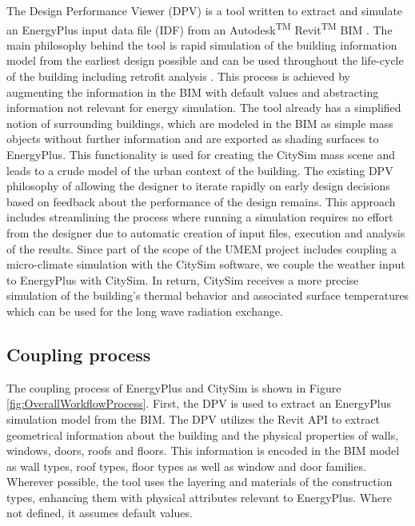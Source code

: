 \documentclass{tBPS2e}
\theoremstyle{plain}
\theoremstyle{definition}
\theoremstyle{remark}
\begin{document}
The Design Performance Viewer (DPV) is a tool written to extract and simulate
an EnergyPlus input data file (IDF) from an Autodesk\textsuperscript{TM} Revit\textsuperscript{TM} BIM
\citep{Schlueter2009}. The main philosophy behind the tool is rapid simulation
of the building information model from the earliest design possible and can be used throughout the life-cycle of the building including retrofit analysis \citep{Miller:2014tu}. This process is achieved by augmenting the information in the BIM with default
values and abstracting information not relevant for energy simulation. The tool
already has a simplified notion of surrounding buildings, which are modeled in
the BIM as simple mass objects without further information and are exported as
shading surfaces to EnergyPlus. This functionality is used for
creating the CitySim mass scene and leads to a crude model of the urban
context of the building. The existing DPV philosophy of allowing the designer to
iterate rapidly on early design decisions based on feedback about the
performance of the design remains. This approach
includes streamlining the process where running a simulation
requires no effort from the designer due to automatic creation of input files,
execution and analysis of the results. Since part of the scope of the UMEM
project includes coupling a micro-climate simulation with the CitySim software,
we couple the weather input to EnergyPlus with CitySim.  In return, CitySim receives a more precise simulation of
the building's thermal behavior and associated surface temperatures which can
be used for the long wave radiation exchange. 

\subsection{Coupling process}
The coupling process of EnergyPlus and CitySim is shown in Figure \ref{fig:OverallWorkflowProcess}. First, the DPV is used to extract an EnergyPlus simulation model from the BIM. The DPV utilizes the Revit API to extract geometrical information about the
building and the physical properties of walls, windows, doors, roofs and
floors. This information is encoded in the BIM model as wall types, roof types,
floor types as well as window and door families. Wherever possible, the tool
uses the layering and materials of the construction types, enhancing them with
physical attributes relevant to EnergyPlus. Where not defined, it assumes
default values.
\end{document}
